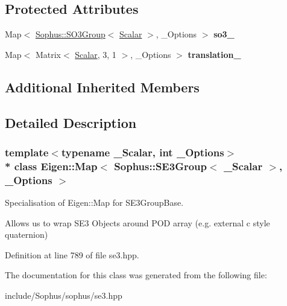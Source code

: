 \subsection*{Protected Attributes}
\begin{DoxyCompactItemize}
\item 
Map$<$ \hyperlink{class_sophus_1_1_s_o3_group}{Sophus\+::\+S\+O3\+Group}$<$ \hyperlink{class_eigen_1_1_map_3_01_sophus_1_1_s_e3_group_3_01___scalar_01_4_00_01___options_01_4_a09d0d1676e19353b9b474da1e5e9df2c}{Scalar} $>$, \+\_\+\+Options $>$ {\bfseries so3\+\_\+}\hypertarget{class_eigen_1_1_map_3_01_sophus_1_1_s_e3_group_3_01___scalar_01_4_00_01___options_01_4_a74d509f06b4a92ad1476935855b2625d}{}\label{class_eigen_1_1_map_3_01_sophus_1_1_s_e3_group_3_01___scalar_01_4_00_01___options_01_4_a74d509f06b4a92ad1476935855b2625d}

\item 
Map$<$ Matrix$<$ \hyperlink{class_eigen_1_1_map_3_01_sophus_1_1_s_e3_group_3_01___scalar_01_4_00_01___options_01_4_a09d0d1676e19353b9b474da1e5e9df2c}{Scalar}, 3, 1 $>$, \+\_\+\+Options $>$ {\bfseries translation\+\_\+}\hypertarget{class_eigen_1_1_map_3_01_sophus_1_1_s_e3_group_3_01___scalar_01_4_00_01___options_01_4_ad13dd0a01748672ac55bf791f386d6a9}{}\label{class_eigen_1_1_map_3_01_sophus_1_1_s_e3_group_3_01___scalar_01_4_00_01___options_01_4_ad13dd0a01748672ac55bf791f386d6a9}

\end{DoxyCompactItemize}
\subsection*{Additional Inherited Members}


\subsection{Detailed Description}
\subsubsection*{template$<$typename \+\_\+\+Scalar, int \+\_\+\+Options$>$\\*
class Eigen\+::\+Map$<$ Sophus\+::\+S\+E3\+Group$<$ \+\_\+\+Scalar $>$, \+\_\+\+Options $>$}

Specialisation of Eigen\+::\+Map for S\+E3\+Group\+Base. 

Allows us to wrap S\+E3 Objects around P\+OD array (e.\+g. external c style quaternion) 

Definition at line 789 of file se3.\+hpp.



The documentation for this class was generated from the following file\+:\begin{DoxyCompactItemize}
\item 
include/\+Sophus/sophus/se3.\+hpp\end{DoxyCompactItemize}
